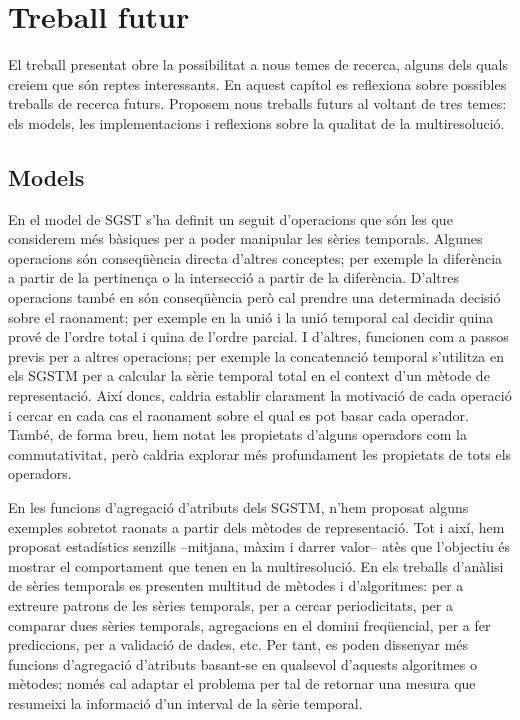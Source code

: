 \chapter{Treball futur}
\label{sec:futur}


El treball presentat obre la possibilitat a nous temes de recerca,
alguns dels quals creiem que són reptes interessants.  En aquest
capítol es reflexiona sobre possibles treballs de recerca futurs.
%
Proposem nous treballs futurs al voltant de tres temes: els models,
les implementacions i reflexions sobre la qualitat de la
multiresolució.


\section{Models}



En el model de \gls{SGST} s'ha definit un seguit d'operacions que són
les que considerem més bàsiques per a poder manipular les sèries
temporals. Algunes operacions són conseqüència directa d'altres
conceptes; per exemple la diferència a partir de la pertinença o la
intersecció a partir de la diferència. D'altres operacions també en
són conseqüència però cal prendre una determinada decisió sobre el
raonament; per exemple en la unió i la unió temporal cal decidir quina
prové de l'ordre total i quina de l'ordre parcial.  I d'altres,
funcionen com a passos previs per a altres operacions; per exemple la
concatenació temporal s'utilitza en els \gls{SGSTM} per a calcular la
sèrie temporal total en el context d'un mètode de representació.  Així
doncs, caldria establir clarament la motivació de cada operació i
cercar en cada cas el raonament sobre el qual es pot basar cada
operador. També, de forma breu, hem notat les propietats d'alguns
operadors com la commutativitat, però caldria explorar més
profundament les propietats de tots els operadors.


En les funcions d'agregació d'atributs dels \gls{SGSTM}, n'hem
proposat alguns exemples sobretot raonats a partir dels mètodes de
representació. Tot i així, hem proposat estadístics senzills
--mitjana, màxim i darrer valor-- atès que l'objectiu és mostrar el
comportament que tenen en la multiresolució.  En els treballs
d'anàlisi de sèries temporals es presenten multitud de mètodes i
d'algoritmes: per a extreure patrons de les sèries temporals, per a
cercar periodicitats, per a comparar dues sèries temporals,
agregacions en el domini freqüencial, per a fer prediccions, per a
validació de dades, etc. Per tant, es poden dissenyar més funcions
d'agregació d'atributs basant-se en qualsevol d'aquests algoritmes o
mètodes; només cal adaptar el problema per tal de retornar una mesura
que resumeixi la informació d'un interval de la sèrie temporal.



